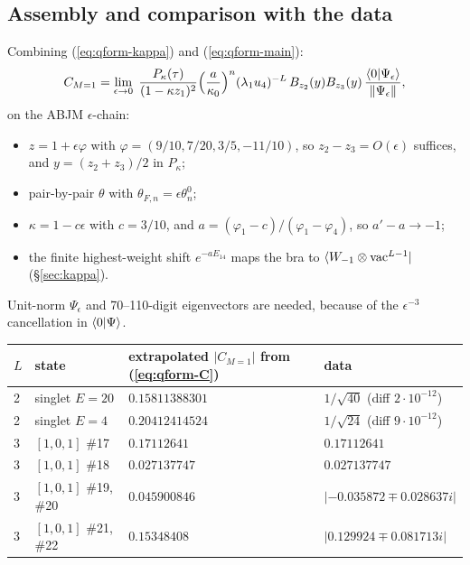 \subsection{Assembly and comparison with the data}\label{sec:qform-assembly}

Combining (\ref{eq:qform-kappa}) and (\ref{eq:qform-main}):
\begin{equation}\label{eq:qform-C}
 C_{M=1}=\lim_{\epsilon\to0}\;\frac{P_\kappa(\tau)}{(1-\kappa z_1)^2}\Big(\frac a{\kappa_0}\Big)^n(\lambda_1u_4)^{-L}\,
 B_{z_2}(y)B_{z_3}(y)\,\frac{\langle0|\Psi_\epsilon\rangle}{\|\Psi_\epsilon\|},
\end{equation}
on the ABJM $\epsilon$-chain:
\begin{itemize}
\item $z=1+\epsilon\varphi$ with $\varphi=(9/10,7/20,3/5,-11/10)$, so $z_2-z_3=O(\epsilon)$ suffices, and $y=(z_2+z_3)/2$ in $P_\kappa$;
\item pair-by-pair $\theta$ with $\theta_{F,n}=\epsilon\theta^0_n$;
\item $\kappa=1-c\epsilon$ with $c=3/10$, and $a=(\varphi_1-c)/(\varphi_1-\varphi_4)$, so $a'-a\to-1$;
\item the finite highest-weight shift $e^{-aE_{14}}$ maps the bra to $\langle W_{-1}\otimes\mathrm{vac}^{L-1}|$ (\S\ref{sec:kappa}).
\end{itemize}
Unit-norm $\Psi_\epsilon$ and 70--110-digit eigenvectors are needed, because of the $\epsilon^{-3}$ cancellation in
$\langle0|\Psi\rangle$.

\begin{center}
\begin{tabular}{llll}
\toprule
$L$ & state & extrapolated $|C_{M=1}|$ from (\ref{eq:qform-C}) & data\\
\midrule
2 & singlet $E=20$ & $0.15811388301$ & $1/\sqrt{40}$ (diff $2\cdot10^{-12}$)\\
2 & singlet $E=4$ & $0.20412414524$ & $1/\sqrt{24}$ (diff $9\cdot10^{-12}$)\\
3 & $[1,0,1]$ \#17 & $0.17112641$ & $0.17112641$\\
3 & $[1,0,1]$ \#18 & $0.027137747$ & $0.027137747$\\
3 & $[1,0,1]$ \#19, \#20 & $0.045900846$ & $|{-0.035872}\mp0.028637i|$\\
3 & $[1,0,1]$ \#21, \#22 & $0.15348408$ & $|0.129924\mp0.081713i|$\\
\bottomrule
\end{tabular}
\end{center}

